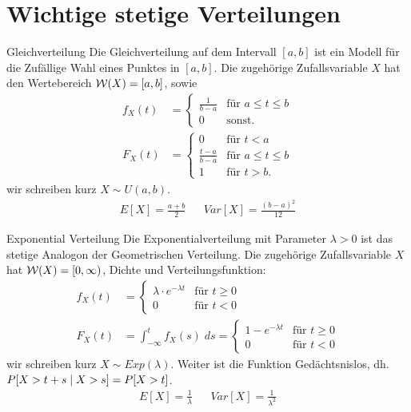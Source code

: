 \section{Wichtige stetige Verteilungen}
\begin{definition}{Gleichverteilung}
  Die Gleichverteilung auf dem Intervall $[a, b]$ ist ein Modell für die
Zufällige Wahl eines Punktes in $[a, b]$. Die zugehörige Zufallsvariable $X$
hat den Wertebereich $\mathcal{W} (X) = [a, b]$, sowie
\begin{align*}
  f_X (t) & =
  \begin{cases}
    \frac{1}{b-a} & \text{für } a \leq t \leq b \\
    0             & \text{sonst.}
  \end{cases} \\
  F_X (t) & =
  \begin{cases}
    0               & \text{für } t < a           \\
    \frac{t-a}{b-a} & \text{für } a \leq t \leq b \\
    1               & \text{für } t > b.
  \end{cases}
\end{align*}
wir schreiben kurz $X \sim U (a, b)$.
\begin{align*}
  E[X] = \frac{a + b}{2} &  & Var[X] = \frac{{(b - a)}^2}{12}
\end{align*}
\end{definition}
\begin{definition}{Exponential Verteilung}
  Die Exponentialverteilung mit Parameter $\lambda > 0$ ist das stetige Analogon
der Geometrischen Verteilung. Die zugehörige Zufallsvariable $X$ hat $\mathcal{W} (X) =
  [0, \infty)$, Dichte und Verteilungsfunktion:
\begin{align*}
  f_X (t) & =
  \begin{cases}
    \lambda \cdot e^{-\lambda t} & \text{für } t \geq 0 \\
    0                            & \text{für }t < 0
  \end{cases} \\
  F_X (t) & =
  \int_{-\infty}^t f_X (s) \; ds =
  \begin{cases}
    1 - e^{-\lambda t} & \text{für } t \geq 0 \\
    0                  & \text{für }t < 0
  \end{cases}
\end{align*}
wir schreiben kurz $X \sim Exp (\lambda)$. Weiter ist
die Funktion Gedächtsnislos, dh. $P[X > t + s \; | \; X > s] = P[X > t]$.
\begin{align*}
  E[X] = \frac{1}{\lambda} &  & Var[X] = \frac{1}{\lambda^2}
\end{align*}
\end{definition}
